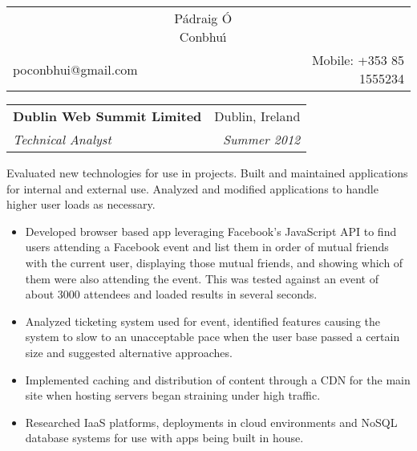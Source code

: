 \documentclass[11pt]{article}
\makeatletter
\newcommand{\resumeSection}[1]{
    \par
    \vspace{\baselineskip}
    \large {\sc {#1}}
    \par
    \vspace{-0.9\baselineskip}
    \hrulefill
    \vspace{0.5\baselineskip}
    \par
}
\newenvironment{resumeSubSectionHeader}{
    \par
    \begin{tabular*}{\textwidth}{l@{\extracolsep{\fill}}r}
    \par
} {
    \end{tabular*}
    \par
}
\newenvironment{resumeSubSectionBody}{
    \par
    \vspace{-0.8\parskip}
    \begin{small}
    \par
} {
    \par
    \end{small}
    \par
}
\makeatother
\begin{document}
\begin{center}
\begin{tabular*}{\textwidth}{@{\extracolsep{\fill}}lcr}

    &{ \huge \textbf \sc P\'{a}draig \'{O} Conbhu\'{\i} }&\\ %
    poconbhui@gmail.com &  & Mobile: +353 85 1555234\\
    \hline\hline

\end{tabular*}
\end{center}


\resumeSection{Experience}


%
%
\begin{resumeSubSectionHeader}

    \textbf{Dublin Web Summit Limited} & Dublin, Ireland \\
    \emph{Technical Analyst}           & \emph{Summer 2012}

\end{resumeSubSectionHeader}
\begin{resumeSubSectionBody}

    Evaluated new technologies for use in projects.
    Built and maintained applications for internal and external use.
    Analyzed and modified applications to handle  higher user loads
    as necessary.

    \begin{itemize}
        \item
            Developed browser based app leveraging Facebook's
            JavaScript API to find users attending a Facebook event
            and list them in order of mutual friends with the current user,
            displaying those mutual friends, and showing which of them
            were also attending the event.
            This was tested against an event of about 3000 attendees and
            loaded results in several seconds.

        \item
            Analyzed ticketing system used for event, identified features
            causing the system to slow to an unacceptable pace when the
            user base passed a certain size and suggested alternative
            approaches.

        \item
            Implemented caching and distribution of content through a CDN
            for the main site when hosting servers began straining under
            high traffic.

        \item
            Researched IaaS platforms, deployments in cloud environments
            and NoSQL database systems for use with apps being built in
            house.
    \end{itemize}

\end{resumeSubSectionBody}
\end{document}
